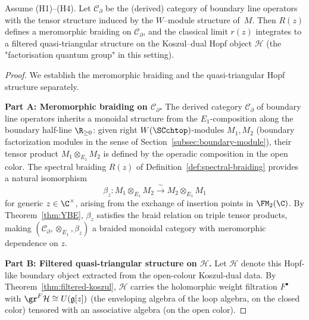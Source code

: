 \begin{theorem}
Assume \textrm{(H1)--(H4)}.
Let $\mathcal C_{\partial}$ be the (derived) category of boundary line operators with the tensor structure induced by the $W$–module structure of~$M$. Then $R(z)$ defines a meromorphic braiding on $\mathcal C_{\partial}$, and the classical limit $r(z)$ integrates to a filtered quasi‑triangular structure on the Koszul–dual Hopf object $\mathcal H$ (the "factorisation quantum group" in this setting).
\end{theorem}

\begin{proof}
We establish the meromorphic braiding and the quasi-triangular Hopf structure separately.

\medskip
\noindent\textbf{Part A: Meromorphic braiding on $\mathcal{C}_\partial$.}
The derived category $\mathcal{C}_\partial$ of boundary line operators inherits a monoidal structure from the $E_1$-composition along the boundary half-line $\R_{\geq 0}$: given right $W(\SCchtop)$-modules $M_1, M_2$ (boundary factorization modules in the sense of Section~\ref{subsec:boundary-module}), their tensor product $M_1 \otimes_{E_1} M_2$ is defined by the operadic composition in the open color. The spectral braiding $R(z)$ of Definition~\ref{def:spectral-braiding} provides a natural isomorphism
\[
\beta_z \colon M_1 \otimes_{E_1} M_2 \xrightarrow{\ \sim\ } M_2 \otimes_{E_1} M_1
\]
for generic $z \in \C^\times$, arising from the exchange of insertion points in $\FM_2(\C)$. By Theorem~\ref{thm:YBE}, $\beta_z$ satisfies the braid relation on triple tensor products, making $(\mathcal{C}_\partial, \otimes_{E_1}, \beta_z)$ a braided monoidal category with meromorphic dependence on $z$.

\medskip
\noindent\textbf{Part B: Filtered quasi-triangular structure on $\mathcal{H}$.}
Let $\mathcal{H}$ denote this Hopf-like boundary object extracted from the open-colour Koszul-dual data. By Theorem~\ref{thm:filtered-koszul}, $\mathcal{H}$ carries the holomorphic weight filtration $F^\bullet$ with $\gr^F \mathcal{H} \cong U(\mathfrak{g}[z])$ (the enveloping algebra of the loop algebra, on the closed color) tensored with an associative algebra (on the open color).


\end{proof}
